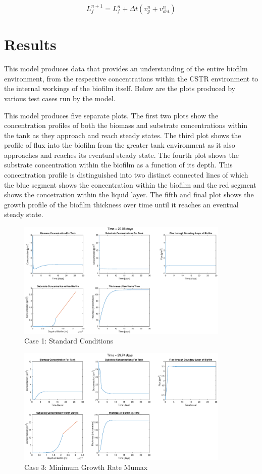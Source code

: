 \documentclass[letterpaper, twoside]{article}
\numberwithin{equation}{section}
\begin{document}
\begin{equation}
  \label{eq:dLfdt_2}
  {L_f^{n+1}}={L_f^{n}} + {\Delta t}({v_g^{n}+v_{det}^{n}})
\end{equation}

\section{Results}
This model produces data that provides an understanding of the entire biofilm environment, from the respective concentrations within the CSTR environment to the internal workings of the biofilm itself. Below are the plots produced by various test cases run by the model.

This model produces five separate plots. The first two plots show the concentration profiles of both the biomass and substrate concentrations within the tank as they approach and reach steady states. The third plot shows the profile of flux into the biofilm from the greater tank environment as it also approaches and reaches its eventual steady state. The fourth plot shows the substrate concentration within the biofilm as a function of its depth. This concentration profile is distinguished into two distinct connected lines of which the blue segment shows the concentration within the biofilm and the red segment shows the concetration within the liquid layer. The fifth and final plot shows the growth profile of the biofilm thickness over time until it reaches an eventual steady state.

\begin{figure}[H]
  \centering
  \includegraphics[read=eps, width=4in]{Testcase1_figure.eps}
  \caption{Case 1: Standard Conditions}
\end{figure}

\begin{figure}[H]
  \centering
  \includegraphics[read=eps, width=4in]{Testcase3_figure.eps}
  \caption{Case 3: Minimum Growth Rate Mumax}
\end{figure}
\end{document}
